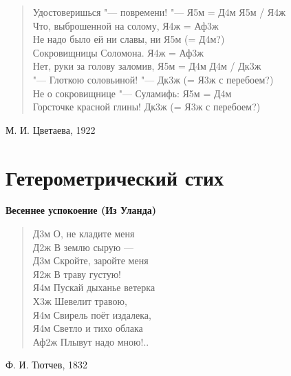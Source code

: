 \documentclass{beamer}
\begin{document}
\begin{frame}

\begin{verse}
Удостоверишься "--- повремени! "---		Я5м = Д4м	Я5м / Я4ж\\
Что, выброшенной на солому,		Я4ж = Аф3ж\\
Не надо было ей ни славы, ни		Я5м (= Д4м?)\\
Сокровищницы Соломона.			Я4ж = Аф3ж\\
	Нет, руки за голову заломив,			Я5м = Д4м						Д4м / Дк3ж\\
"---  Глоткою соловьиной! "--- 			Дк3ж (= Я3ж с перебоем?)\\
Не о сокровищнице "--- Суламифь:	Я5м = Д4м\\
Горсточке красной глины!				Дк3ж (= Я3ж с перебоем?)
\end{verse}

М. И. Цветаева, 1922

\end{frame}

\section{Гетерометрический стих}\label{sec:hetero}

\begin{frame}
\begin{center}
\textbf{Весеннее успокоение (Из Уланда)}
\end{center}
\begin{verse}

Д3м О, не кладите меня\\
Д2ж В землю сырую —	\\
Д3м Скройте, заройте меня\\
Я2ж В траву густую!\\
Я4м Пускай дыханье ветерка\\
Х3ж Шевелит травою,\\
Я4м Свирель поёт издалека,\\
Я4м Светло и тихо облака\\
Аф2ж Плывут надо мною!..\\


\end{verse}

Ф. И. Тютчев, 1832

\end{frame}
\end{document}
